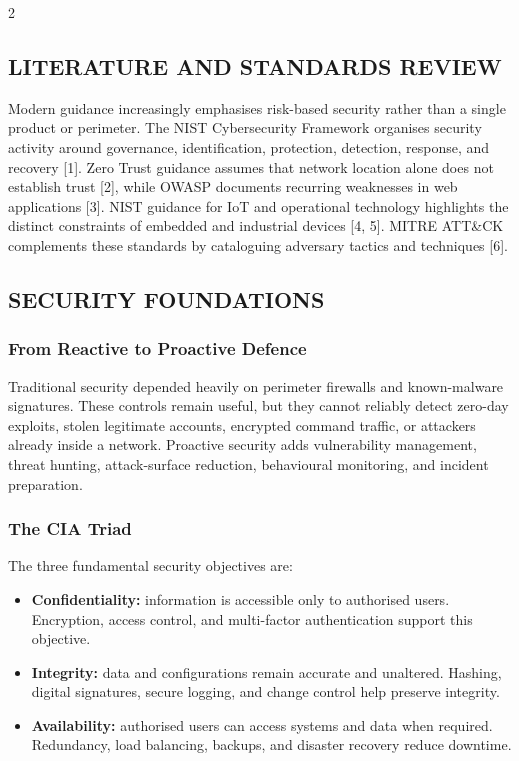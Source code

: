 \begin{multicols}{2}
  \subsection*{\centering\uppercase{Literature and Standards Review}}
  { Modern guidance increasingly emphasises risk-based security rather than a single product or perimeter. The NIST Cybersecurity Framework organises security activity around governance, identification, protection, detection, response, and recovery [1]. Zero Trust guidance assumes that network location alone does not establish trust [2], while OWASP documents recurring weaknesses in web applications [3]. NIST guidance for IoT and operational technology highlights the distinct constraints of embedded and industrial devices [4, 5].   MITRE ATT\&CK complements these standards by cataloguing adversary tactics and techniques [6].\par}

  \subsection*{\centering\uppercase{Security Foundations}}

  \subsubsection*{From Reactive to Proactive Defence}
  { Traditional security depended heavily on perimeter firewalls and known-malware signatures. These controls remain useful, but they cannot reliably detect zero-day exploits, stolen legitimate accounts, encrypted command traffic, or attackers already inside a network. Proactive security adds vulnerability management, threat hunting, attack-surface reduction, behavioural monitoring, and incident preparation.\par}

  \subsubsection*{The CIA Triad}
  The three fundamental security objectives are:
  \begin{itemize}\justifying\small\setlength{\itemsep}{0pt}\setlength{\parsep}{0pt}\setlength{\topsep}{0pt}\setlength{\partopsep}{0pt}
    \item \textbf{Confidentiality:} information is accessible only to authorised users. Encryption, access control, and multi-factor authentication support this objective.
    \item \textbf{Integrity:} data and configurations remain accurate and unaltered. Hashing, digital signatures, secure logging, and change control help preserve integrity.
    \item \textbf{Availability:} authorised users can access systems and data when required. Redundancy, load balancing, backups, and disaster recovery reduce downtime.
  \end{itemize}


\end{multicols}
